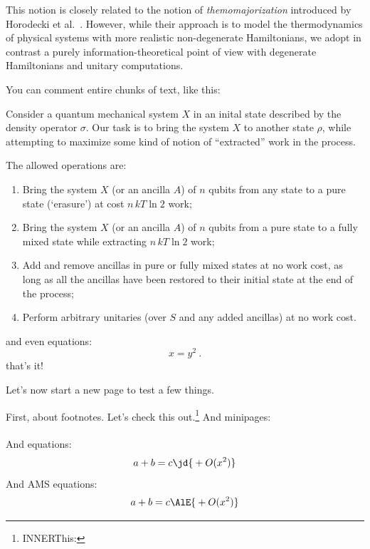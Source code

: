 \documentclass[10pt,a4paper,aps,reprint,notitlepage]{revtex4-1}
\begin{document}
This notion is closely related to the notion of {\em themomajorization} introduced by
Horodecki et al.~\cite{Horodecki2013_ThermoMaj}. However, while their approach is to model
the thermodynamics of physical systems with more realistic non-degenerate Hamiltonians, we
adopt in contrast a purely information-theoretical point of view with degenerate
Hamiltonians and unitary computations.

\phf* You can comment entire chunks of text, like this:

Consider a quantum mechanical system $X$ in an inital state described by the
density operator $\sigma$.  Our task is to bring the system $X$ to another state
$\rho$, while attempting to maximize some kind of notion of ``extracted'' work
in the process.

The allowed operations are:
\begin{enumerate}[label=(\alph*)]
\item Bring the system $X$ (or an ancilla $A$) of $n$ qubits from any state to a pure state (`erasure') at
  cost $n\,kT\ln 2$ work;
\item Bring the system $X$ (or an ancilla $A$) of $n$ qubits from a pure state to a fully mixed state while
  extracting $n\,kT\ln 2$ work;
\item Add and remove ancillas in pure or fully mixed states at no work cost, as long as all the ancillas have
  been restored to their initial state at the end of the process;
\item Perform arbitrary unitaries (over $S$ and any added ancillas) at no work cost.
\end{enumerate}

and even equations:
\begin{equation}
  x = y^2\ .
\end{equation}
that's it! \endphf

\clearpage
Let's now start a new page to test a few things.

First, about footnotes. Let's check this out.\footnote{\ifinner INNER\fi This: }  And minipages:
\\
\\
And equations:
\begin{equation}
  a + b = c \text{\jd{\(\displaystyle{}+O(x^2)\)}}
\end{equation}
And AMS equations:
\begin{align}
  a + b = c \text{\AlE{\(\displaystyle{}+O(x^2)\)}}
\end{align}
\end{document}
